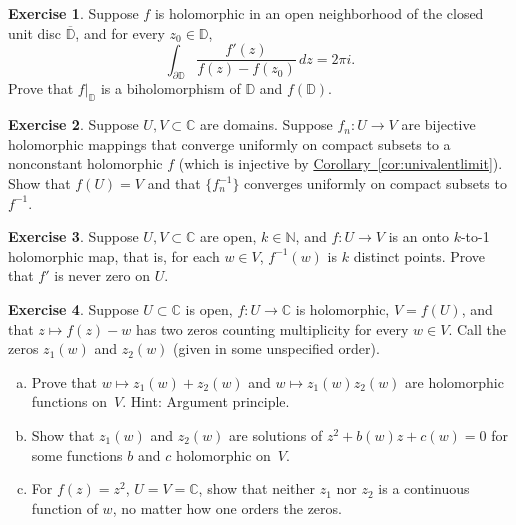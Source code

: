 \documentclass[12pt,openany]{book}
\newcommand{\C}{{\mathbb{C}}}
\newcommand{\N}{{\mathbb{N}}}
\newcommand{\D}{{\mathbb{D}}}
\theoremstyle{plain}
\theoremstyle{remark}
\theoremstyle{definition}
\newenvironment{exbox}{%
    \def\FrameCommand{\vrule width 1pt \relax\hspace{10pt}}%
    \MakeFramed{\advance\hsize-\width\FrameRestore}%
}{%
    \endMakeFramed
}
\newenvironment{exparts}{%
    \leavevmode\begin{enumerate}[a),noitemsep,topsep=0pt,parsep=0pt,partopsep=0pt]
}{%
    \end{enumerate}
}
\theoremstyle{exercise}
\newtheorem{exercise}{Exercise}[section]
\theoremstyle{example}
\newcommand{\corref}[1]{\hyperref[#1]{Corollary~\ref*{#1}}}
\begin{document}
\begin{exbox}
\begin{exercise}
Suppose $f$ is holomorphic in an open neighborhood of the closed unit disc
$\overline{\D}$, and for every $z_0 \in \D$,
\begin{equation*}
\int_{\partial \D}
\frac{f'(z)}{f(z)-f(z_0)}
\, dz = 2\pi i .
\end{equation*}
Prove that $f|_{\D}$ is a biholomorphism of $\D$ and $f(\D)$.
\end{exercise}

\begin{exercise}
Suppose $U,V \subset \C$ are domains.
Suppose $f_n \colon U \to V$ are bijective holomorphic mappings
that converge uniformly on compact subsets to a nonconstant
holomorphic $f$ (which is injective by \corref{cor:univalentlimit}).
Show that $f(U) = V$ and that $\bigl\{ f_n^{-1} \bigr\}$ converges uniformly on
compact subsets to $f^{-1}$.
\end{exercise}

\begin{exercise} \label{exercise:ktoone}
Suppose $U,V \subset \C$ are open, $k \in \N$, and $f \colon U \to V$ is an
onto $k$-to-1
holomorphic map, that is, for each $w \in V$, $f^{-1}(w)$ is $k$ distinct
points.  Prove that $f'$ is never zero on $U$.
\end{exercise}

\begin{exercise}
Suppose $U \subset \C$ is open, $f \colon U \to \C$ is
holomorphic, $V = f(U)$, and that $z \mapsto f(z)-w$
has two zeros counting multiplicity for every $w \in V$.
Call the zeros
$z_1(w)$ and $z_2(w)$ (given in some unspecified order).
\begin{exparts}
\item
Prove that $w \mapsto z_1(w)+z_2(w)$ and 
$w \mapsto z_1(w)z_2(w)$ are holomorphic functions on~$V$.
Hint: Argument principle.
\item
Show that $z_1(w)$ and $z_2(w)$ are solutions of
$z^2 + b(w) z + c(w) = 0$ for some functions $b$ and $c$ holomorphic on~$V$.
\item
For $f(z) = z^2$, $U = V = \C$, show that neither $z_1$ nor $z_2$ is a continuous
function of $w$,
no matter how one orders the zeros.
\end{exparts}
\end{exercise}
\end{exbox}


\end{document}
